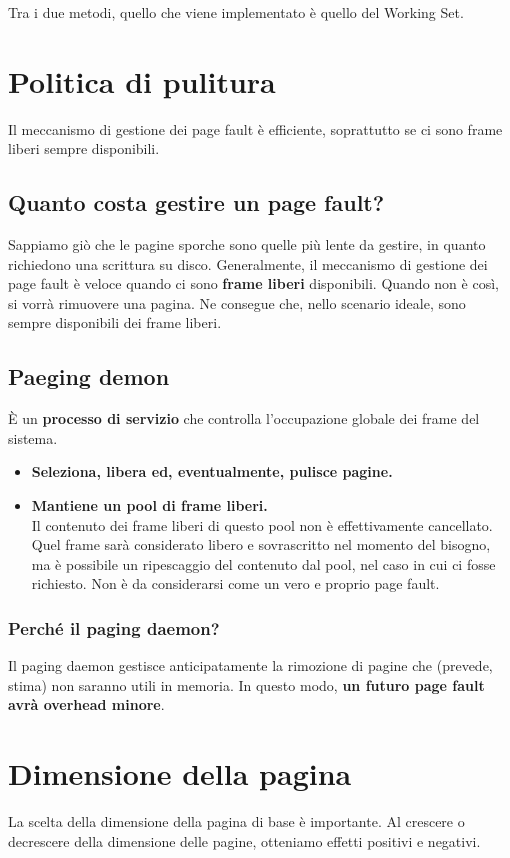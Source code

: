 \documentclass{report}
\begin{document}
Tra i due metodi, quello che viene implementato è quello del Working Set.
\newpage

\section{Politica di pulitura}
Il meccanismo di gestione dei page fault è efficiente, soprattutto se ci sono frame liberi sempre disponibili.

\subsection{Quanto costa gestire un page fault?}
Sappiamo giò che le pagine sporche sono quelle più lente da gestire, in quanto richiedono una scrittura su disco. Generalmente, il meccanismo di gestione dei page fault è veloce quando ci sono \textbf{frame liberi} disponibili. Quando non è così, si vorrà rimuovere una pagina. Ne consegue che, nello scenario ideale, sono sempre disponibili dei frame liberi.

\subsection{Paeging demon}
È un \textbf{processo di servizio} che controlla l'occupazione globale dei frame del sistema.
\begin{itemize}
    \item \textbf{Seleziona, libera ed, eventualmente, pulisce pagine.}
    \item \textbf{Mantiene un pool di frame liberi.}\\
    Il contenuto dei frame liberi di questo pool non è effettivamente cancellato. Quel frame sarà considerato libero e sovrascritto nel momento del bisogno, ma è possibile un ripescaggio del contenuto dal pool, nel caso in cui ci fosse richiesto. Non è da considerarsi come un vero e proprio page fault.
\end{itemize}

\subsubsection{Perché il paging daemon?}
Il paging daemon gestisce anticipatamente la rimozione di pagine che (prevede, stima) non saranno utili in memoria. In questo modo, \textbf{un futuro page fault avrà overhead minore}.


\section{Dimensione della pagina}
La scelta della dimensione della pagina di base è importante. Al crescere o decrescere della dimensione delle pagine, otteniamo effetti positivi e negativi.
\end{document}
